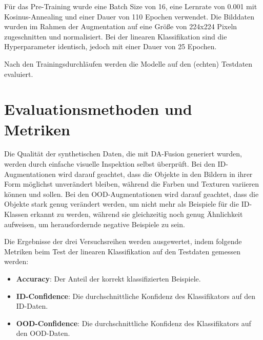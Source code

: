 Für das Pre-Training wurde eine Batch Size von 16, eine Lernrate von 0.001 mit Kosinus-Annealing und einer Dauer von 110 Epochen verwendet. Die Bilddaten wurden im Rahmen der Augmentation auf eine Größe von 224x224 Pixeln zugeschnitten und normalisiert. Bei der linearen Klassifikation sind die Hyperparameter identisch, jedoch mit einer Dauer von 25 Epochen.

Nach den Trainingsdurchläufen werden die Modelle auf den (echten) Testdaten evaluiert.

\section{Evaluationsmethoden und Metriken} \label{sec:evaluation}

Die Qualität der synthetischen Daten, die mit DA-Fusion generiert wurden, werden durch einfache visuelle Inspektion selbst überprüft. Bei den ID-Augmentationen wird darauf geachtet, dass die Objekte in den Bildern in ihrer Form möglichst unverändert bleiben, während die Farben und Texturen variieren können und sollen. Bei den OOD-Augmentationen wird darauf geachtet, dass die Objekte stark genug verändert werden, um nicht mehr als Beispiele für die ID-Klassen erkannt zu werden, während sie gleichzeitig noch genug Ähnlichkeit aufweisen, um herausfordernde negative Beispiele zu sein.

Die Ergebnisse der drei Versuchsreihen werden ausgewertet, indem folgende Metriken beim Test der linearen Klassifikation auf den Testdaten gemessen werden:

\begin{itemize}
	\item \textbf{Accuracy}: Der Anteil der korrekt klassifizierten Beispiele.
	\item \textbf{ID-Confidence}: Die durchschnittliche Konfidenz des Klassifikators auf den ID-Daten.
	\item \textbf{OOD-Confidence}: Die durchschnittliche Konfidenz des Klassifikators auf den OOD-Daten.
\end{itemize}